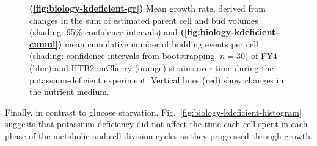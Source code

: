 \begin{figure}[ht!]
  \caption[
    Mean growth rate, derived from changes in the sum of estimated parent cell and bud volumes and
    mean cumulative number of budding events per cell
    of FY4 and HTB2::mCherry strains over time during the potassium-deficient experiment.
  ]{
    \textbf{(\ref{fig:biology-kdeficient-gr})}
    Mean growth rate, derived from changes in the sum of estimated parent cell and bud volumes (shading: 95\% confidence intervals) and
    \textbf{(\ref{fig:biology-kdeficient-cumul})}
    mean cumulative number of budding events per cell (shading: confidence intervals from bootstrapping, $n=30$)
    of FY4 (blue) and HTB2::mCherry (orange) strains over time during the potassium-deficient experiment.
    Vertical lines (red) show changes in the nutrient medium.
  }
  \label{fig:biology-kdeficient-gr-budprob}
\end{figure}

Finally, in contrast to glucose starvation, Fig.\ \ref{fig:biology-kdeficient-histogram} suggests that potassium deficiency did not affect the time each cell spent in each phase of the metabolic and cell division cycles as they progressed through growth.

